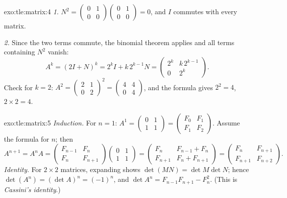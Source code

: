 \begin{solution}{exo:tle:matrix:4}
\emph{1.} $N^2 = \begin{pmatrix} 0&1\\0&0\end{pmatrix}
\begin{pmatrix} 0&1\\0&0\end{pmatrix} = 0$, and $I$ commutes with every
matrix.

\emph{2.} Since the two terms commute, the binomial theorem applies and all
terms containing $N^2$ vanish:
\[
A^k = (2I + N)^k = 2^k I + k\,2^{k-1} N
= \begin{pmatrix} 2^k & k\,2^{k-1}\\ 0 & 2^k \end{pmatrix}.
\]
Check for $k = 2$:
$A^2 = \begin{pmatrix} 2&1\\0&2\end{pmatrix}^2
= \begin{pmatrix} 4&4\\0&4\end{pmatrix}$, and the formula gives
$2^2 = 4$, $2 \times 2 = 4$. \checkmark
\end{solution}

\begin{solution}{exo:tle:matrix:5}
\emph{Induction.} For $n = 1$:
$A^1 = \begin{pmatrix} 0&1\\1&1\end{pmatrix}
= \begin{pmatrix} F_0 & F_1\\ F_1 & F_2\end{pmatrix}$. Assume the formula
for $n$; then
\[
A^{n+1} = A^n A
= \begin{pmatrix} F_{n-1} & F_n\\ F_n & F_{n+1}\end{pmatrix}
\begin{pmatrix} 0 & 1\\ 1 & 1\end{pmatrix}
= \begin{pmatrix} F_n & F_{n-1} + F_n\\ F_{n+1} & F_n + F_{n+1}\end{pmatrix}
= \begin{pmatrix} F_n & F_{n+1}\\ F_{n+1} & F_{n+2}\end{pmatrix}.
\]
\emph{Identity.} For $2\times2$ matrices, expanding shows
$\det(MN) = \det M \det N$; hence
$\det(A^n) = (\det A)^n = (-1)^n$, and
$\det A^n = F_{n-1}F_{n+1} - F_n^2$. (This is \emph{Cassini's identity}.)
\end{solution}

